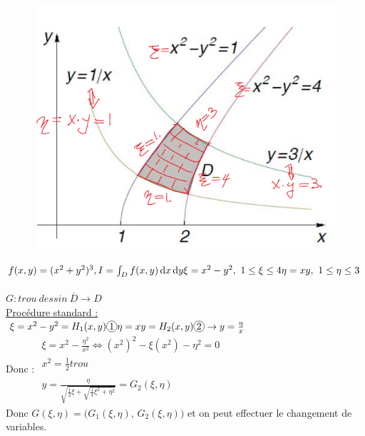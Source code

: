 \documentclass[12pt,a4paper]{article}
\begin{document}
\begin{figure}
	\includegraphics[scale=0.4]{images/domaine_courbe_niveau}
\end{figure}
$\noindent f(x,y) = (x^2+y^2)^3,\\
\\
I = \int_D f(x,y) \deriv{x}\deriv{y}\\
\\
\xi = x^2-y^2,\ 1\leq \xi \leq 4\\
\\
\eta = xy,\ 1\leq \eta \leq 3$\\
\\
$G : {trou\ dessin\ \overline{D}} \to D$\\
\uline{Procédure standard :}\\
$\xi = x^2-y^2 = H_1 (x,y) \circled{1}\\
\eta = xy = H_2(x,y) \circled{2} \to y = \frac{\eta}{x}$\\
Donc  : $\begin{array}{l}
	\xi = x^2-\frac{\eta^2}{x^2} \iff (x^2)^2 -\xi(x^2) - \eta^2 = 0\\
	x^2 = \frac{1}{2}{trou}\\
	\\
	y = \frac{\eta}{\sqrt{\frac{1}{2}\xi + \sqrt{\frac{1}{4} \xi^2 + \eta^2}}} = G_2(\xi,\eta)
\end{array}$\\
Donc $G(\xi,\eta) = \big(G_1(\xi,\eta),\, G_2(\xi,\eta)\big)$ et on peut effectuer le changement de variables.\\
\end{document}
